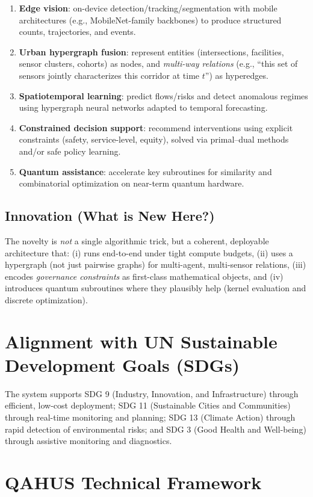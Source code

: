 \documentclass[11pt]{article}
\begin{document}
\begin{enumerate}[leftmargin=*]
\item \textbf{Edge vision}: on-device detection/tracking/segmentation with mobile architectures
(e.g., MobileNet-family backbones) to produce structured counts, trajectories, and events.
\item \textbf{Urban hypergraph fusion}: represent entities (intersections, facilities, sensor clusters, cohorts)
as nodes, and \emph{multi-way relations} (e.g., ``this set of sensors jointly characterizes this corridor at time $t$'')
as hyperedges.
\item \textbf{Spatiotemporal learning}: predict flows/risks and detect anomalous regimes using hypergraph neural
networks adapted to temporal forecasting.
\item \textbf{Constrained decision support}: recommend interventions using explicit constraints (safety,
service-level, equity), solved via primal--dual methods and/or safe policy learning.
\item \textbf{Quantum assistance}: accelerate key subroutines for similarity and combinatorial optimization on
near-term quantum hardware.
\end{enumerate}

\subsection{Innovation (What is New Here?)}
The novelty is \emph{not} a single algorithmic trick, but a coherent, deployable architecture that:
(i) runs end-to-end under tight compute budgets,
(ii) uses a hypergraph (not just pairwise graphs) for multi-agent, multi-sensor relations,
(iii) encodes \emph{governance constraints} as first-class mathematical objects, and
(iv) introduces quantum subroutines where they plausibly help (kernel evaluation and discrete optimization).

\section{Alignment with UN Sustainable Development Goals (SDGs)}
The system supports SDG 9 (Industry, Innovation, and Infrastructure) through efficient, low-cost deployment;
SDG 11 (Sustainable Cities and Communities) through real-time monitoring and planning; SDG 13 (Climate Action)
through rapid detection of environmental risks; and SDG 3 (Good Health and Well-being) through assistive
monitoring and diagnostics.

\section{QAHUS Technical Framework}
\end{document}
